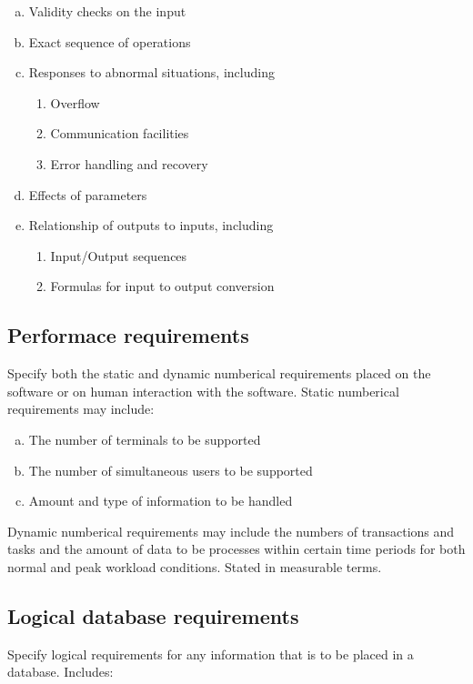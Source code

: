 \documentclass[10pt]{article}
\begin{document}
     \begin{enumerate}[(a)]
     \item{Validity checks on the input}
     \item{Exact sequence of operations}
     \item{Responses to abnormal situations, including}
       \begin{enumerate}
       \item{Overflow}
       \item{Communication facilities}
       \item{Error handling and recovery}
       \end{enumerate}
     \item{Effects of parameters}
     \item{Relationship of outputs to inputs, including}
       \begin{enumerate}
       \item{Input/Output sequences}
       \item{Formulas for input to output conversion}
       \end{enumerate}
    \end{enumerate}

     \subsection{Performace requirements}
     Specify both the static and dynamic numberical requirements placed on the software or on human interaction with the software. Static numberical requirements may include:
     
     \begin{enumerate}[(a)]
     \item{The number of terminals to be supported}
     \item{The number of simultaneous users to be supported}
     \item{Amount and type of information to be handled}
     \end{enumerate}

     Dynamic numberical requirements may include the numbers of transactions and tasks and the amount of data to be processes within certain time periods for both normal and peak workload conditions. Stated in measurable terms.

     \subsection{Logical database requirements}
     Specify logical requirements for any information that is to be placed in a database. Includes:
     
\end{document}
